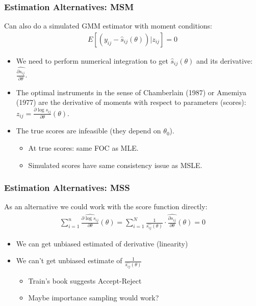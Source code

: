 \begin{frame}
\frametitle{Estimation Alternatives: MSM}
Can also do a simulated GMM estimator with moment conditions:
\begin{align*}
E\left[\left(y_{ij} - \widehat{s}_{ij}(\theta) \right) | z_{ij} \right]=0
\end{align*}
\begin{itemize}
\item We need to perform numerical integration to get $\widehat{s}_{ij}(\theta)$ and its derivative: $\widehat{\frac{\partial s_{ij}}{\partial \theta}}$.
\item The \alert{optimal instruments} in the sense of Chamberlain (1987) or Amemiya (1977) are the derivative of moments with respect to parameters (\alert{scores}): $z_{ij} = \frac{\partial \log s_{ij}}{\partial \theta}(\theta)$.
\item The true scores are infeasible (they depend on $\theta_0$).
\begin{itemize}
\item At true scores: same FOC as MLE.
\item Simulated scores have same consistency issue as MSLE.
\end{itemize}
\end{itemize}
\end{frame}


\begin{frame}
\frametitle{Estimation Alternatives: MSS}
As an alternative we could work with the score function directly:
\begin{align*}
\sum_{i=1}^n\widehat { \frac{\partial \log s_{ij}}{\partial \theta}}(\theta) =\sum_{i=1}^N \frac{1}{\widehat{s_{ij}}(\theta)} \cdot  \widehat{\frac{\partial s_{ij}}{\partial \theta}}(\theta) = 0
\end{align*}
\begin{itemize}
\item We can get unbiased estimated of derivative (linearity)
\item We can't get unbiased estimate of $\frac{1}{\widehat{s_{ij}}(\theta)}$
\begin{itemize}
\item Train's book suggests Accept-Reject 
\item Maybe importance sampling would work?
\end{itemize}
\end{itemize}
\end{frame}

